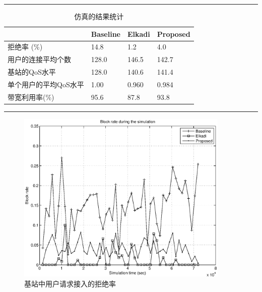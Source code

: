 \begin{table}[tb]
\caption{仿真的结果统计} \label{tb_cacop_res_sim}
\begin{center}
\def\temptablewidth{1\textwidth}
{\rule{\temptablewidth}{1pt}}
\begin{tabular*}{\temptablewidth}{@{\extracolsep{\fill}}llll}
 &Baseline &Elkadi &Proposed\\
\hline
拒绝率 (\%) &14.8 & 1.2 &4.0\\
用户的连接平均个数&128.0 &146.5 &142.7\\
基站的QoS水平 &128.0 &140.6 &141.4\\
单个用户的平均QoS水平 &1.00 &0.960 &0.984\\
带宽利用率(\%) &95.6 &87.8 &93.8\\
 \hline
\end{tabular*}
 {\rule{\temptablewidth}{1pt}}
 \end{center}
\end{table}

%
\begin{figure}[htb]
\centering
\includegraphics[width=4in] {clock_accept_block_drop.eps}
\caption{基站中用户请求接入的拒绝率}
\label{cacop_pic_clock_accept_block_drop}
\end{figure}

